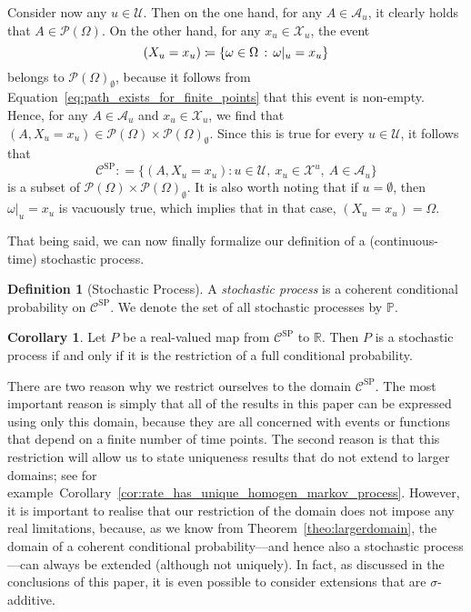 \documentclass[10pt,a4paper]{paper}
\theoremstyle{definition}
\newtheorem{corollary}[theorem]{Corollary}
\newtheorem{definition}{Definition}
\newcommand{\reals}{\mathbb{R}}
\newcommand{\states}{\mathcal{X}}
\newcommand{\paths}{\Omega}
\newcommand{\power}{\mathcal{P}(\paths)}
\newcommand{\nonemptypower}{\power_{\emptyset}}
\newcommand{\processes}{\mathbb{P}}
\newcommand{\coloneqq}{:\!=}
\begin{document}
Consider now any $u\in\mathcal{U}$. Then on the one hand, for any $A\in\mathcal{A}_u$, it clearly holds that $A\in\power$. On the other hand, for any $x_u\in\states_u$, the event
\begin{equation*}
(X_u=x_u) \coloneqq \{\omega\in\Omega\,:\,\omega\vert_u=x_u\}
\vspace{4pt}
\end{equation*}
belongs to $\nonemptypower$, because it follows from Equation~\eqref{eq:path_exists_for_finite_points} that this event is non-empty. 
Hence, for any $A\in\mathcal{A}_u$ and $x_u\in\states_u$, we find that $(A,X_u=x_u)\in\power\times\nonemptypower$. Since this is true for every $u\in\mathcal{U}$, it follows that
\begin{equation*}
\mathcal{C}^\mathrm{SP}\coloneqq\big\{
(A,X_u=x_u)
\colon
u\in\mathcal{U},~x_u\in\states^u,~A\in\mathcal{A}_u\big\}
\end{equation*}
is a subset of $\power\times\nonemptypower$. It is also worth noting that if $u=\emptyset$, then $\omega\vert_u=x_u$ is vacuously true, which implies that in that case, $(X_u=x_u)=\Omega$.


That being said, we can now finally formalize our definition of a (continuous-time) stochastic process.

\begin{definition}[Stochastic Process]\label{def:stoch_process}
A \emph{stochastic process} is a coherent conditional probability on $\mathcal{C}^\mathrm{SP}$. We denote the set of all stochastic processes by $\processes$.
\end{definition}


\begin{corollary}\label{corol:processiffrestriction}
Let $P$ be a real-valued map from $\mathcal{C}^\mathrm{SP}$ to $\reals$. Then $P$ is a stochastic process if and only if it is the restriction of a full conditional probability.
\end{corollary}

There are two reason why we restrict ourselves to the domain $\mathcal{C}^\mathrm{SP}$. The most important reason is simply that all of the results in this paper can be expressed using only this domain, because they are all concerned with events or functions that depend on a finite number of time points. The second reason is that this restriction will allow us to state  uniqueness results that do not extend to larger domains; see for example~Corollary~\ref{cor:rate_has_unique_homogen_markov_process}. However, it is important to realise that our restriction of the domain does not impose any real limitations, because, as we know from Theorem~\ref{theo:largerdomain}, the domain of a coherent conditional probability---and hence also a stochastic process---can always be extended (although not uniquely). In fact, as discussed in the conclusions of this paper, it is even possible to consider extensions that are $\sigma$-additive.
\end{document}
